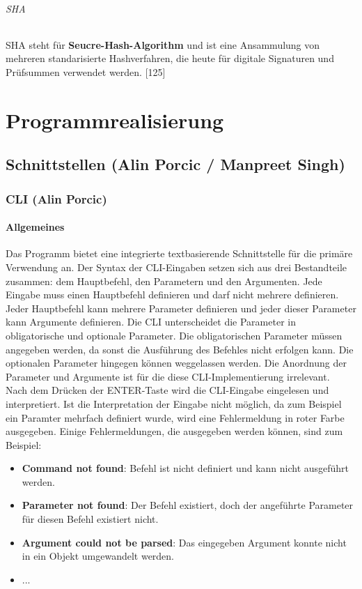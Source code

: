 \documentclass[12pt,a4paper]{report}
\begin{document}
\begin{onehalfspace}
\paragraph{SHA}

SHA steht für \textbf{Seucre-Hash-Algorithm} und ist eine Ansammulung von mehreren standarisierte Hashverfahren, die heute für digitale Signaturen und Prüfsummen verwendet werden. [125]

\part{Programmrealisierung}

\chapter{Schnittstellen (Alin Porcic / Manpreet Singh)}

\section{CLI (Alin Porcic)}

\subsection{Allgemeines}

Das Programm bietet eine integrierte textbasierende Schnittstelle für die primäre Verwendung an. Der Syntax der CLI-Eingaben setzen sich aus drei Bestandteile zusammen: dem Hauptbefehl, den Parametern und den Argumenten. Jede Eingabe muss einen Hauptbefehl definieren und darf nicht mehrere definieren. Jeder Hauptbefehl kann mehrere Parameter definieren und jeder dieser Parameter kann Argumente definieren. Die CLI unterscheidet die Parameter in obligatorische und optionale Parameter. Die obligatorischen Parameter müssen angegeben werden, da sonst die Ausführung des Befehles nicht erfolgen kann. Die optionalen Parameter hingegen können weggelassen werden. Die Anordnung der Parameter und Argumente ist für die diese CLI-Implementierung irrelevant.\\

Nach dem Drücken der ENTER-Taste wird die CLI-Eingabe eingelesen und interpretiert. Ist die Interpretation der Eingabe nicht möglich, da zum Beispiel ein Paramter mehrfach definiert wurde, wird eine Fehlermeldung in roter Farbe ausgegeben. Einige Fehlermeldungen, die ausgegeben werden können, sind zum Beispiel:

\begin{itemize}
\item \textbf{Command not found}: Befehl ist nicht definiert und kann nicht ausgeführt werden.
\item \textbf{Parameter not found}: Der Befehl existiert, doch der angeführte Parameter für diesen Befehl existiert nicht.
\item \textbf{Argument could not be parsed}: Das eingegeben Argument konnte nicht in ein Objekt umgewandelt werden.
\item ...
\end{itemize}


\end{onehalfspace}
\end{document}

